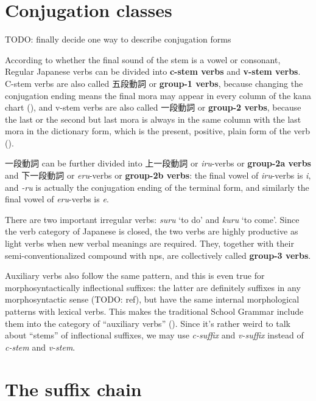 \documentclass[UTF8, a4paper, oneside, scheme=plain]{ctexrep}
\newcommand*{\concept}[1]{\textbf{#1}}
\newcommand*{\term}[1]{\emph{#1}}
\newcommand{\corpus}[1]{\emph{#1}}
\newcommand{\translate}[1]{`#1'}
\begin{document}
\section{Conjugation classes}\label{sec:conjugation-class}

TODO: finally decide one way to describe conjugation forms

According to whether the final sound of the stem is a vowel or consonant,
Regular Japanese verbs can be divided into \concept{c-stem verbs} and \concept{v-stem verbs}.
C-stem verbs are also called 五段動詞 or \concept{group-1 verbs},
because changing the conjugation ending means 
the final mora may appear in every column of the kana chart (), 
and v-stem verbs are also called 一段動詞 or \concept{group-2 verbs},
because the last or the second but last mora is always in the same column 
with the last mora in the dictionary form,
which is the present, positive, plain form of the verb ().

一段動詞 can be further divided into 上一段動詞 or \corpus{iru}-verbs or \concept{group-2a verbs} 
and 下一段動詞 or \corpus{eru}-verbs or \concept{group-2b verbs}:
the final vowel of \corpus{iru}-verbs is \corpus{i},
and \corpus{-ru} is actually the conjugation ending of the terminal form,
and similarly the final vowel of \corpus{eru}-verbs is \corpus{e}.

There are two important irregular verbs: \corpus{suru} \translate{to do} 
and \corpus{kuru} \translate{to come}.
Since the verb category of Japanese is closed,
the two verbs are highly productive as light verbs when new verbal meanings are required.
They, together with their semi-conventionalized compound with \ac{np}s,
are collectively called \concept{group-3 verbs}.

Auxiliary verbs also follow the same pattern,
and this is even true for morphosyntactically inflectional suffixes:
the latter are definitely suffixes in any morphosyntactic sense (TODO: ref),
but have the same internal morphological patterns with lexical verbs.
This makes the traditional School Grammar include them into the category of ``auxiliary verbs''
().
Since it's rather weird to talk about ``stems'' of inflectional suffixes,
we may use \term{c-suffix} and \term{v-suffix} instead of 
\term{c-stem} and \term{v-stem}.

\section{The suffix chain}
\end{document}
